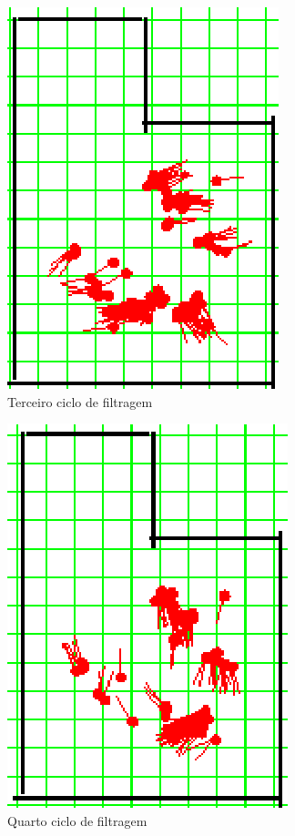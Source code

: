 \begin{figure}[H]
  \centering
  \includegraphics[scale=1]{figuras/cen1_ex1/4.eps}
  \caption[Terceiro Ciclo de Filtragem]{Terceiro ciclo de filtragem}
  \label{img:cen1_ex1_4}
\end{figure}

\begin{figure}[H]
  \centering
  \includegraphics[scale=1]{figuras/cen1_ex1/5.eps}
  \caption[Quarto Ciclo de Filtragem]{Quarto ciclo de filtragem}
  \label{img:cen1_ex1_5}
\end{figure}

